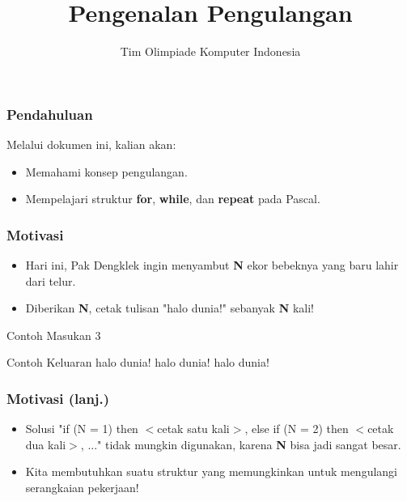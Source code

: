 \documentclass{beamer}
\title{Pengenalan Pengulangan}
\author{Tim Olimpiade Komputer Indonesia}
\begin{document}
\begin{frame}
\titlepage
\end{frame}

\begin{frame}
\frametitle{Pendahuluan}
Melalui dokumen ini, kalian akan:
\begin{itemize}
	\item Memahami konsep pengulangan.
	\item Mempelajari struktur \textbf{for}, \textbf{while}, dan \textbf{repeat} pada Pascal.
\end{itemize}
\end{frame}

\begin{frame}
\frametitle{Motivasi}
\begin{itemize}
	\item Hari ini, Pak Dengklek ingin menyambut \textbf{N} ekor bebeknya yang baru lahir dari telur.
	\item Diberikan \textbf{N}, cetak tulisan "halo dunia!" sebanyak \textbf{N} kali!
\end{itemize}
\begin{block}{Contoh Masukan}
3
\end{block}
\begin{block}{Contoh Keluaran}
halo dunia!\newline
halo dunia!\newline
halo dunia!
\end{block}
\end{frame}

\begin{frame}
\frametitle{Motivasi (lanj.)}
\begin{itemize}
	\item Solusi "if (N = 1) then $<$cetak satu kali$>$, else if (N = 2) then $<$cetak dua kali$>$, ..." tidak mungkin digunakan, karena \textbf{N} bisa jadi sangat besar.
	\item Kita membutuhkan suatu struktur yang memungkinkan untuk mengulangi serangkaian pekerjaan!
\end{itemize}
\end{frame}
\end{document}
